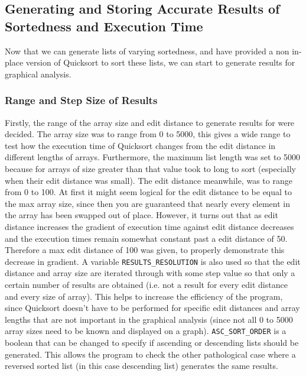 \documentclass{article}
\begin{document}
\subsection{Generating and Storing Accurate Results of Sortedness and Execution Time}
Now that we can generate lists of varying sortedness, and have provided a non in-place version of Quicksort to sort these lists, we can start to generate results for graphical analysis. 
\subsubsection{Range and Step Size of Results}
Firstly, the range of the array size and edit distance to generate results for were decided. The array size was to range from 0 to 5000, this gives a wide range to test how the execution time of Quicksort changes from the edit distance in different lengths of arrays. Furthermore, the maximum list length was set to 5000 because for arrays of size greater than that value took to long to sort (especially when their edit distance was small). The edit distance meanwhile, was to range from 0 to 100. At first it might seem logical for the edit distance to be equal to the max array size, since then you are guaranteed that nearly every element in the array has been swapped out of place. However, it turns out that as edit distance increases the gradient of execution time against edit distance decreases and the execution times remain somewhat constant past a edit distance of 50. Therefore a max edit distance of 100 was given, to properly demonstrate this decrease in gradient. A variable \verb+RESULTS_RESOLUTION+ is also used so that the edit distance and array size are iterated through with some step value so that only a certain number of results are obtained (i.e. not a result for every edit distance and every size of array). This helps to increase the efficiency of the program, since Quicksort doesn't have to be performed for specific edit distances and array lengths that are not important in the graphical analysis (since not all 0 to 5000 array sizes need to be known and displayed on a graph). \verb+ASC_SORT_ORDER+ is a boolean that can be changed to specify if ascending or descending lists should be generated. This allows the program to check the other pathological case where a reversed sorted list (in this case descending list) generates the same results.
\end{document}
